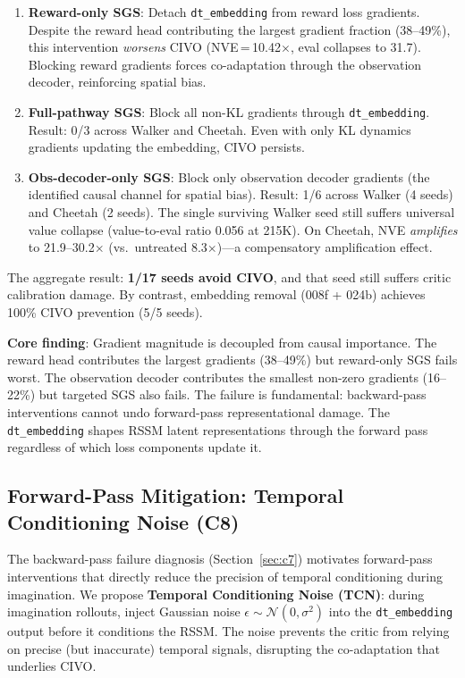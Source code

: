 \documentclass[10pt,letterpaper]{article}
\begin{document}
\begin{enumerate}[leftmargin=*,nosep]
    \item \textbf{Reward-only SGS}: Detach \texttt{dt\_embedding} from reward loss gradients. Despite the reward head contributing the largest gradient fraction (38--49\%), this intervention \emph{worsens} CIVO (NVE\,=\,10.42$\times$, eval collapses to 31.7). Blocking reward gradients forces co-adaptation through the observation decoder, reinforcing spatial bias.
    \item \textbf{Full-pathway SGS}: Block all non-KL gradients through \texttt{dt\_embedding}. Result: 0/3 across Walker and Cheetah. Even with only KL dynamics gradients updating the embedding, CIVO persists.
    \item \textbf{Obs-decoder-only SGS}: Block only observation decoder gradients (the identified causal channel for spatial bias). Result: 1/6 across Walker (4 seeds) and Cheetah (2 seeds). The single surviving Walker seed still suffers universal value collapse (value-to-eval ratio 0.056 at 215K). On Cheetah, NVE \emph{amplifies} to 21.9--30.2$\times$ (vs.\ untreated 8.3$\times$)---a compensatory amplification effect.
\end{enumerate}

The aggregate result: \textbf{1/17 seeds avoid CIVO}, and that seed still suffers critic calibration damage.
By contrast, embedding removal (008f + 024b) achieves 100\% CIVO prevention (5/5 seeds).

\textbf{Core finding}: Gradient magnitude is decoupled from causal importance.
The reward head contributes the largest gradients (38--49\%) but reward-only SGS fails worst.
The observation decoder contributes the smallest non-zero gradients (16--22\%) but targeted SGS also fails.
The failure is fundamental: backward-pass interventions cannot undo forward-pass representational damage.
The \texttt{dt\_embedding} shapes RSSM latent representations through the forward pass regardless of which loss components update it.

\subsection{Forward-Pass Mitigation: Temporal Conditioning Noise (C8)}
\label{sec:c8}

The backward-pass failure diagnosis (Section~\ref{sec:c7}) motivates forward-pass interventions that directly reduce the precision of temporal conditioning during imagination.
We propose \textbf{Temporal Conditioning Noise (TCN)}: during imagination rollouts, inject Gaussian noise $\epsilon \sim \mathcal{N}(0, \sigma^2)$ into the \texttt{dt\_embedding} output before it conditions the RSSM.
The noise prevents the critic from relying on precise (but inaccurate) temporal signals, disrupting the co-adaptation that underlies CIVO.
\end{document}
